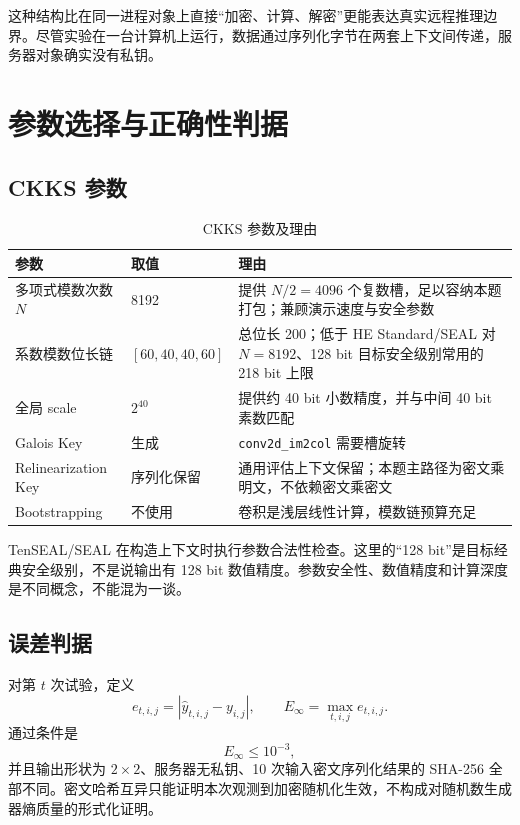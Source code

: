 \documentclass[UTF8,a4paper,zihao=-4]{ctexart}
\begin{document}
这种结构比在同一进程对象上直接“加密、计算、解密”更能表达真实远程推理边界。尽管实验在一台计算机上运行，数据通过序列化字节在两套上下文间传递，服务器对象确实没有私钥。

\section{参数选择与正确性判据}

\subsection{CKKS 参数}

\begin{table}[H]
\centering
\caption{CKKS 参数及理由}
\label{tab:params}
\begin{tabularx}{\textwidth}{p{}p{}X}
\toprule
参数 & 取值 & 理由\\
\midrule
多项式模数次数 $N$ & 8192 & 提供 $N/2=4096$ 个复数槽，足以容纳本题打包；兼顾演示速度与安全参数\\
系数模数位长链 & $[60,40,40,60]$ & 总位长 200；低于 HE Standard/SEAL 对 $N=8192$、128 bit 目标安全级别常用的 218 bit 上限\cite{hestandard,seal}\\
全局 scale & $2^{40}$ & 提供约 40 bit 小数精度，并与中间 40 bit 素数匹配\\
Galois Key & 生成 & \texttt{conv2d\_im2col} 需要槽旋转\\
Relinearization Key & 序列化保留 & 通用评估上下文保留；本题主路径为密文乘明文，不依赖密文乘密文\\
Bootstrapping & 不使用 & 卷积是浅层线性计算，模数链预算充足\\
\bottomrule
\end{tabularx}
\end{table}

TenSEAL/SEAL 在构造上下文时执行参数合法性检查。这里的“128 bit”是目标经典安全级别，不是说输出有 128 bit 数值精度。参数安全性、数值精度和计算深度是不同概念，不能混为一谈。

\subsection{误差判据}

对第 $t$ 次试验，定义
\[
e_{t,i,j}=\left|\widehat{y}_{t,i,j}-y_{i,j}\right|,
\qquad
E_\infty=\max_{t,i,j}e_{t,i,j}.
\]
通过条件是
\[
E_\infty\le10^{-3},
\]
并且输出形状为 $2\times2$、服务器无私钥、10 次输入密文序列化结果的 SHA-256 全部不同。密文哈希互异只能证明本次观测到加密随机化生效，不构成对随机数生成器熵质量的形式化证明。
\end{document}
